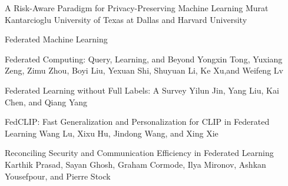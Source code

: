 \documentclass[11pt]{article}
\begin{document}
\begin{bulletin}
\begin{opinionsection}
\begin{opinion}{A Risk-Aware Paradigm for Privacy-Preserving Machine Learning}
  {Murat Kantarcioglu}
  {University of Texas at Dallas and Harvard University}

\end{opinion}
\end{opinionsection}


\begin{articlesection}{Federated Machine Learning}
%
%


% 

\begin{article}
{Federated Computing: Query, Learning, and Beyond}
{Yongxin Tong, Yuxiang Zeng, Zimu Zhou, Boyi Liu, Yexuan Shi, Shuyuan Li, Ke Xu,and Weifeng Lv}

\end{article}

\begin{article}
{Federated Learning without Full Labels: A Survey}
{Yilun Jin, Yang Liu, Kai Chen, and Qiang Yang}

\end{article}



\begin{article}
{FedCLIP: Fast Generalization and Personalization for CLIP in Federated Learning}
{Wang Lu, Xixu Hu, Jindong Wang, and Xing Xie}

\end{article}

\begin{article}
{Reconciling Security and Communication Efficiency in Federated Learning}
{Karthik Prasad, Sayan Ghosh, Graham Cormode, Ilya Mironov, Ashkan Yousefpour, and Pierre Stock}

\end{article}


\end{articlesection}
\end{bulletin}
\end{document}
